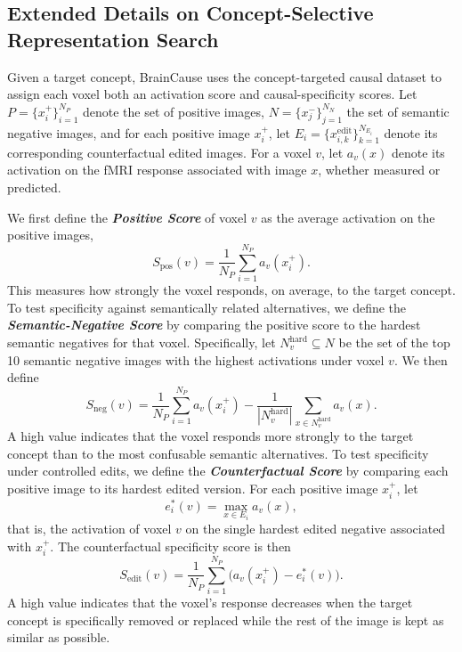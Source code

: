 \documentclass{llmxive}
\begin{document}
\subsection{Extended Details on Concept-Selective Representation Search}
\label{sec_sup:Search}

Given a target concept, BrainCause uses the concept-targeted causal dataset to assign each voxel both an activation score and causal-specificity scores. Let \(P=\{x_i^{+}\}_{i=1}^{N_{P}}\) denote the set of positive images, \(N=\{x_j^{-}\}_{j=1}^{N_{N}}\) the set of semantic negative images, and for each positive image \(x_i^{+}\), let \(E_i=\{x_{i,k}^{\mathrm{edit}}\}_{k=1}^{N_{E_i}}\) denote its corresponding counterfactual edited images. For a voxel \(v\), let \(a_v(x)\) denote its activation on the fMRI response associated with image \(x\), whether measured or predicted.

We first define the \emph{\textbf{Positive Score}} of voxel \(v\) as the average activation on the positive images,
\[
S_{\mathrm{pos}}(v)=\frac{1}{N_P}\sum_{i=1}^{N_P} a_v(x_i^{+}).
\]
This measures how strongly the voxel responds, on average, to the target concept. To test specificity against semantically related alternatives, we define the \emph{\textbf{Semantic-Negative Score}} by comparing the positive score to the hardest semantic negatives for that voxel. Specifically, let \(N_v^{\mathrm{hard}}\subseteq N\) be the set of the top 10 semantic negative images with the highest activations under voxel \(v\). We then define
\[
S_{\mathrm{neg}}(v)=
\frac{1}{N_P}\sum_{i=1}^{N_P} a_v(x_i^{+})
-
\frac{1}{|N_v^{\mathrm{hard}}|}\sum_{x\in N_v^{\mathrm{hard}}} a_v(x).
\]
A high value indicates that the voxel responds more strongly to the target concept than to the most confusable semantic alternatives. To test specificity under controlled edits, we define the \emph{\textbf{Counterfactual Score}} by comparing each positive image to its hardest edited version. For each positive image \(x_i^{+}\), let
\[
e_i^*(v)=\max_{x\in E_i} a_v(x),
\]
that is, the activation of voxel \(v\) on the single hardest edited negative associated with \(x_i^{+}\). The counterfactual specificity score is then
\[
S_{\mathrm{edit}}(v)=
\frac{1}{N_P}\sum_{i=1}^{N_P}\Big(a_v(x_i^{+})-e_i^*(v)\Big).
\]
A high value indicates that the voxel's response decreases when the target concept is specifically removed or replaced while the rest of the image is kept as similar as possible.
\end{document}
